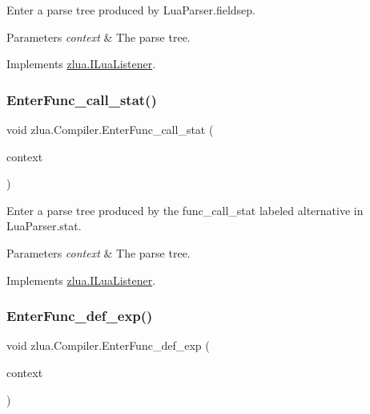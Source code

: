 Enter a parse tree produced by Lua\+Parser.\+fieldsep. 


\begin{DoxyParams}{Parameters}
{\em context} & The parse tree.\\
\hline
\end{DoxyParams}


Implements \mbox{\hyperlink{interfacezlua_1_1_i_lua_listener_a9ee512ebb70fc9f3fe8bcc35b0e6efe4}{zlua.\+I\+Lua\+Listener}}.

\mbox{\label{classzlua_1_1_compiler_a8a7c628a67d4fbca64f86739a32b1162}} 
\subsubsection{\texorpdfstring{Enter\+Func\+\_\+call\+\_\+stat()}{EnterFunc\_call\_stat()}}
{\footnotesize\ttfamily void zlua.\+Compiler.\+Enter\+Func\+\_\+call\+\_\+stat (\begin{DoxyParamCaption}\item[{\mbox{[}\+Not\+Null\mbox{]} \mbox{\hyperlink{classzlua_1_1_lua_parser_1_1_func__call__stat_context}{Lua\+Parser.\+Func\+\_\+call\+\_\+stat\+Context}}}]{context }\end{DoxyParamCaption})}



Enter a parse tree produced by the {\ttfamily func\+\_\+call\+\_\+stat} labeled alternative in Lua\+Parser.\+stat. 


\begin{DoxyParams}{Parameters}
{\em context} & The parse tree.\\
\hline
\end{DoxyParams}


Implements \mbox{\hyperlink{interfacezlua_1_1_i_lua_listener_a082ec71bf7dc3bee6dd365c9a56ee59c}{zlua.\+I\+Lua\+Listener}}.

\mbox{\label{classzlua_1_1_compiler_a626c3684acd46bdc1812ebd74d2ce10e}} 
\subsubsection{\texorpdfstring{Enter\+Func\+\_\+def\+\_\+exp()}{EnterFunc\_def\_exp()}}
{\footnotesize\ttfamily void zlua.\+Compiler.\+Enter\+Func\+\_\+def\+\_\+exp (\begin{DoxyParamCaption}\item[{\mbox{[}\+Not\+Null\mbox{]} \mbox{\hyperlink{classzlua_1_1_lua_parser_1_1_func__def__exp_context}{Lua\+Parser.\+Func\+\_\+def\+\_\+exp\+Context}}}]{context }\end{DoxyParamCaption})}



